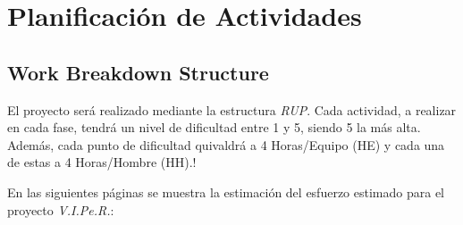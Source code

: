 \appendix
\addappheadtotoc
\appendixpage

\chapter{Planificaci\'on de Actividades}
\label{appen:planificacion}

\newpage
\section[WBS]{Work Breakdown Structure}
\label{section:wbs}
El proyecto ser\'a realizado mediante la estructura \emph{RUP}. Cada actividad, a realizar en cada fase, tendr\'a un nivel de dificultad entre 1 y 5, siendo 5 la m\'as alta. Adem\'as, cada punto de dificultad quivaldr\'a a 4 Horas/Equipo (HE) y cada una de estas a 4 Horas/Hombre (HH).!

En las siguientes p\'aginas se muestra la estimaci\'on del esfuerzo estimado para el proyecto \emph{V.I.Pe.R.}:

